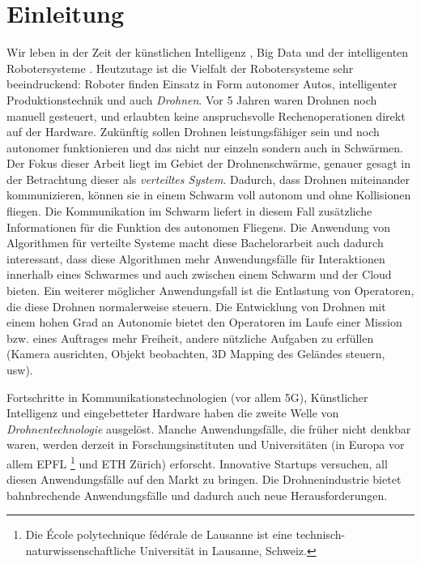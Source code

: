 \chapter{Einleitung}
\label{cha:Einleitung}

Wir leben in der Zeit der künstlichen Intelligenz \cite{MITai}, Big Data \cite{MITbigData, MITbigData2} und der intelligenten Robotersysteme \cite{MITrobots, MITrobots2}. Heutzutage ist die Vielfalt der Robotersysteme sehr beeindruckend: Roboter finden Einsatz in Form autonomer Autos, intelligenter Produktionstechnik und auch \textit{Drohnen}. Vor 5 Jahren waren Drohnen noch manuell gesteuert, und erlaubten keine anspruchsvolle Rechenoperationen direkt auf der Hardware. Zukünftig sollen Drohnen leistungsfähiger sein und noch autonomer funktionieren und das nicht nur einzeln sondern auch in Schwärmen. Der Fokus dieser Arbeit liegt im Gebiet der Drohnenschwärme, genauer gesagt in der Betrachtung dieser als \textit{verteiltes System}. Dadurch, dass Drohnen miteinander kommunizieren, können sie in einem Schwarm voll autonom und ohne Kollisionen fliegen. Die Kommunikation im Schwarm liefert in diesem Fall zusätzliche Informationen für die Funktion des autonomen Fliegens. Die Anwendung von Algorithmen für verteilte Systeme macht diese Bachelorarbeit auch dadurch interessant, dass diese Algorithmen mehr Anwendungsfälle für Interaktionen innerhalb eines Schwarmes und auch zwischen einem Schwarm und der Cloud bieten. Ein weiterer möglicher Anwendungsfall ist die Entlastung von Operatoren, die diese Drohnen normalerweise steuern. Die Entwicklung von Drohnen mit einem hohen Grad an Autonomie bietet den Operatoren im Laufe einer Mission bzw. eines Auftrages mehr Freiheit, andere nützliche Aufgaben zu erfüllen (Kamera ausrichten, Objekt beobachten, 3D Mapping des Geländes steuern, usw).

Fortschritte in Kommunikationstechnologien (vor allem 5G), Künstlicher Intelligenz und eingebetteter Hardware haben die zweite Welle von \textit{Drohnentechnologie} ausgelöst. Manche Anwendungsfälle, die früher nicht denkbar waren, werden derzeit in Forschungsinstituten und Universitäten (in Europa vor allem EPFL  \footnote{Die École polytechnique fédérale de Lausanne ist eine technisch-naturwissenschaftliche Universität in Lausanne, Schweiz.} und ETH Zürich) erforscht. Innovative Startups versuchen, all diesen Anwendungsfälle auf den Markt zu bringen. Die Drohnenindustrie bietet bahnbrechende Anwendungsfälle und dadurch auch neue Herausforderungen.

